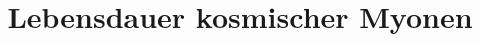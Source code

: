 

\subject{V01}
\title{Lebensdauer kosmischer Myonen}



\maketitle

\thispagestyle{empty}


\newpage

\tableofcontents

\newpage
\setcounter{page}{1}





\nocite{*}
\newpage
\printbibliography{}


